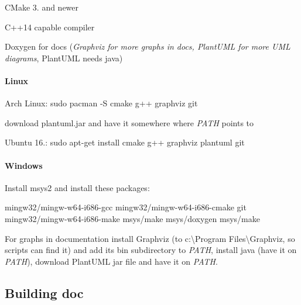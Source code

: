 \begin{DoxyItemize}
\item C\+Make 3. and newer
\item C++14 capable compiler
\item Doxygen for docs ({\itshape Graphviz for more graphs in docs, Plant\+U\+ML for more U\+ML diagrams}, Plant\+U\+ML needs java)
\end{DoxyItemize}

\paragraph*{Linux}


\begin{DoxyItemize}
\item Arch Linux\+: {\ttfamily sudo pacman -\/S cmake g++ graphviz git}
\begin{DoxyItemize}
\item download plantuml.\+jar and have it somewhere where {\itshape P\+A\+TH} points to
\end{DoxyItemize}
\item Ubuntu 16.\+: {\ttfamily sudo apt-\/get install cmake g++ graphviz plantuml git}
\end{DoxyItemize}

\paragraph*{Windows}


\begin{DoxyItemize}
\item Install msys2 and install these packages\+:
\begin{DoxyItemize}
\item {\ttfamily mingw32/mingw-\/w64-\/i686-\/gcc mingw32/mingw-\/w64-\/i686-\/cmake git mingw32/mingw-\/w64-\/i686-\/make msys/make msys/doxygen msys/make}
\end{DoxyItemize}
\item For graphs in documentation install Graphviz (to {\ttfamily c\+:\textbackslash{}Program Files\textbackslash{}Graphviz}, so scripts can find it) and add its {\ttfamily bin} subdirectory to {\itshape P\+A\+TH}, install java (have it on {\itshape P\+A\+TH}), download Plant\+U\+ML jar file and have it on {\itshape P\+A\+TH}.
\end{DoxyItemize}

\subsection*{Building doc}

